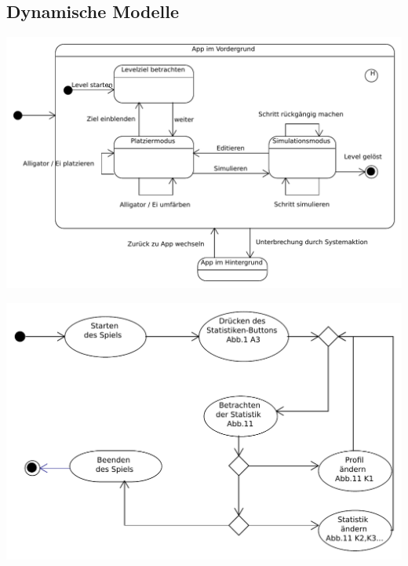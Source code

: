 \subsection{Dynamische Modelle}
\begin{center}
\includegraphics[scale=0.6]{Systemmodelle/game_state.pdf}
\end{center}
\begin{center}
\includegraphics[scale=0.6]{Systemmodelle/parent_activity.pdf}
\end{center}
\clearpage
